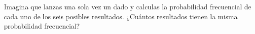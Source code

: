 Imagina que lanzas una sola vez un dado y calculas la probabilidad frecuencial de cada uno de los seis posibles resultados.
¿Cuántos resultados tienen la misma probabilidad frecuencial?

\begin{oneparchoices}
\end{oneparchoices}